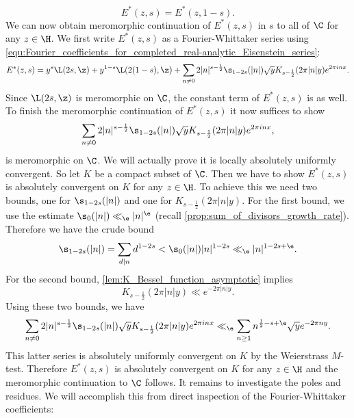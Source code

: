       \[
        E^{\ast}(z,s) = E^{\ast}(z,1-s).
      \]
      We can now obtain meromorphic continuation of $E^{\ast}(z,s)$ in $s$ to all of $\C$ for any $z \in \H$. We first write $E^{\ast}(z,s)$ as a Fourier-Whittaker series using \cref{equ:Fourier_coefficients_for_completed_real-analytic_Eisenstein_series}:
      \[
        E^{\ast}(z,s) = y^{s}\L(2s,\z)+y^{1-s}\L(2(1-s),\z)+\sum_{n \neq 0}2|n|^{s-\frac{1}{2}}\s_{1-2s}(|n|)\sqrt{y}K_{s-\frac{1}{2}}(2\pi|n|y)e^{2\pi inx}.
      \]
      Since $\L(2s,\z)$ is meromorphic on $\C$, the constant term of $E^{\ast}(z,s)$ is as well. To finish the meromorphic continuation of $E^{\ast}(z,s)$ it now suffices to show
      \[
        \sum_{n \neq 0}2|n|^{s-\frac{1}{2}}\s_{1-2s}(|n|)\sqrt{y}K_{s-\frac{1}{2}}(2\pi|n|y)e^{2\pi inx},
      \]
      is meromorphic on $\C$. We will actually prove it is locally absolutely uniformly convergent. So let $K$ be a compact subset of $\C$. Then we have to show $E^{\ast}(z,s)$ is absolutely convergent on $K$ for any $z \in \H$. To achieve this we need two bounds, one for $\s_{1-2s}(|n|)$ and one for $K_{s-\frac{1}{2}}(2\pi|n|y)$. For the first bound, we use the estimate $\s_{0}(|n|) \ll_{\e} |n|^{\e}$ (recall \cref{prop:sum_of_divisors_growth_rate}). Therefore we have the crude bound
      \[
        \s_{1-2s}(|n|) = \sum_{d \mid n}d^{1-2s} < \s_{0}(|n|)|n|^{1-2s} \ll_{\e}|n|^{1-2s+\e}.
      \]
      For the second bound, \cref{lem:K_Bessel_function_asymptotic} implies
      \[
        K_{s-\frac{1}{2}}(2\pi|n|y) \ll e^{-2\pi|n|y}.
      \]
      Using these two bounds, we have
      \begin{equation}\label{equ:non-constant_Fourier_coefficient_bound_non-holomorphic_Eisenstein_series}
        \sum_{n \neq 0}2|n|^{s-\frac{1}{2}}\s_{1-2s}(|n|)\sqrt{y}K_{s-\frac{1}{2}}(2\pi|n|y)e^{2\pi inx} \ll_{\e} \sum_{n \ge 1}n^{\frac{1}{2}-s+\e}\sqrt{y}e^{-2\pi ny}.
      \end{equation}
      This latter series is absolutely uniformly convergent on $K$ by the Weierstrass $M$-test. Therefore $E^{\ast}(z,s)$ is absolutely convergent on $K$ for any $z \in \H$ and the meromorphic continuation to $\C$ follows. It remains to investigate the poles and residues. We will accomplish this from direct inspection of the Fourier-Whittaker coefficients:

